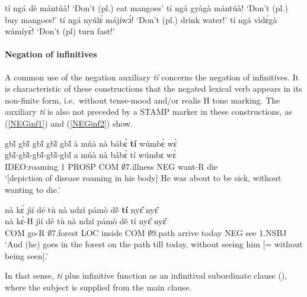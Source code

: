 \begin{exe}
\ex\label{NEGIMPPLOBJ}
\begin{xlist}
\ex tí ngá dè mántúà!  `Don't (pl.) eat mangoes'
\ex tí ngá gyàgà mántúà!  `Don't (pl.) buy mangoes!'
\ex tí ngá nyúlɛ̀ májíwɔ́!  `Don't (pl.) drink water!'
\ex tí ngá vìdɛ̀gà wámíyɛ̀!  `Don't (pl) turn fast!' 
\end{xlist}
\end{exe}











\paragraph{Negation of infinitives}
A common use of the negation auxiliary {\itshape tí} concerns the negation of infinitives. It is characteristic of these constructions that the negated lexical verb appears in its non-finite form, i.e.\ without tense-mood and/or realis H tone marking. The auxiliary {\itshape tí} is also not preceded by a STAMP marker in these constructions, as (\ref{NEGinf1}) and (\ref{NEGinf2}) show.

\begin{exe} 
\ex\label{NEGinf1} 
  \glll  gbĩ́ gbĩ̀ gbĩ́ gbĩ̀ gbĩ́   à múà nà bábɛ̀ {\bfseries tí} wúmbɛ̀ wɛ̀ \\
            gbĩ́-gbĩ̀-gbĩ́-gbĩ̀-gbĩ́  a múà nà bábɛ̀ tí wúmbɛ wɛ̀   \\
         IDEO:roaming 1 PROSP COM $\emptyset$7.illness NEG want-R die \\
    \trans `[depiction of disease roaming in his body] He was about to be sick, without wanting to die.'
\end{exe}

\begin{exe} 
\ex\label{NEGinf2}
  \glll    nà kɛ́ jìí dé tù nà ndzǐ pámò dẽ̂ {\bfseries tí} nyɛ̂ nyɛ̂ \\
          nà kɛ̀-H jìí dé tù nà ndzǐ pámò dẽ  tí nyɛ̂ nyɛ̂ \\
         COM go-R $\emptyset$7.forest LOC inside COM $\emptyset$9.path arrive today NEG see 1.NSBJ\\
    \trans `And (he) goes in the forest on the path till today, without seeing him [= without being seen].'
\end{exe}

\noindent In that sense, {\itshape tí} plus infinitive function as an infinitival subordinate clause (), where the subject is supplied from the main clause. 

